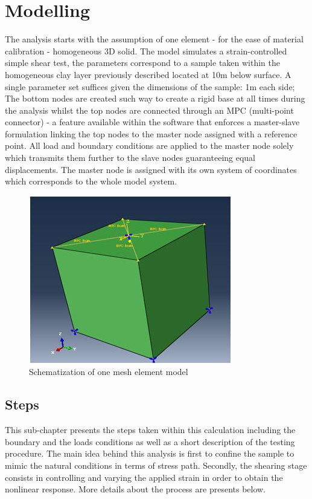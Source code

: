 \documentclass[12pt,a4paper]{report}
\begin{document}
\section{Modelling}

The analysis starts with the assumption of one element - for the ease of material calibration - homogeneous 3D solid. The model simulates a strain-controlled simple shear test, the parameters correspond to a sample taken within the homogeneous clay layer previously described located at 10m below surface. A single parameter set suffices given the dimensions of the sample: 1m each side; The bottom nodes are created such way to create a rigid base at all times during the analysis whilst the top nodes are connected through an MPC (multi-point connector) - a feature available within the software that enforces a master-slave formulation linking the top nodes to the master node assigned with a reference point. All load and boundary conditions are applied to the master node solely which transmits them further to the slave nodes guaranteeing equal displacements. The master node is assigned with its own system of coordinates which corresponds to the whole model system.

\begin{figure}[h!]
	\centering
	\includegraphics[width=0.7\linewidth]{"1dmodel"}
	\caption{Schematization of one mesh element model }
	\label{cube}
\end{figure}

\subsection{Steps}
This sub-chapter presents the steps taken within this calculation including the boundary and the loads conditions as well as a short description of the testing procedure. The main idea behind this analysis is first to confine the sample to mimic the natural conditions in terms of stress path. Secondly, the shearing stage consists in controlling and varying the applied strain in order to obtain the nonlinear response. More details about the process are presents below. 
\end{document}
